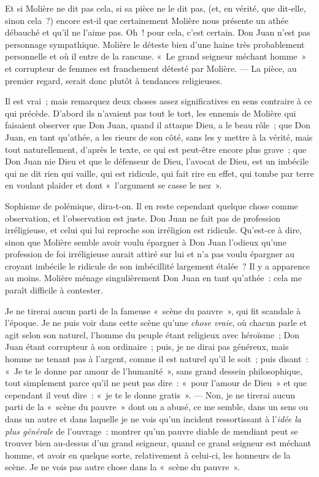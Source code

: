 \documentclass[french,twoside]{book} %
\begin{document}
Et si Molière ne dit pas cela, si sa pièce ne le dit pas, (et, en vérité, que dit-elle, sinon cela ?) encore est-il que certainement Molière nous présente un athée débauché et qu’il ne l’aime pas. Oh ! pour cela, c’est certain. Don Juan n’est pas personnage sympathique. Molière le déteste bien d’une haine  très probablement personnelle et où il entre de la rancune. « Le grand seigneur méchant homme » et corrupteur de femmes est franchement détesté par Molière. — La pièce, au premier regard, serait donc plutôt à tendances religieuses.\par
Il est vrai ; mais remarquez deux choses assez significatives en sens contraire à ce qui précède. D’abord ils n’avaient pas tout le tort, les ennemis de Molière qui faisaient observer que Don Juan, quand il attaque Dieu, a le beau rôle ; que Don Juan, en tant qu’athée, a les rieurs de son côté, sans les y mettre à la vérité, mais tout naturellement, d’après le texte, ce qui est peut-être encore plus grave ; que Don Juan nie Dieu et que le défenseur de Dieu, l’avocat de Dieu, est un imbécile qui ne dit rien qui vaille, qui est ridicule, qui fait rire en effet, qui tombe par terre en voulant plaider et dont « l’argument se casse le nez ».\par
Sophisme de polémique, dira-t-on. Il en reste cependant quelque chose comme observation, et l’observation est juste. Don Juan ne fait pas de profession irréligieuse, et celui qui lui reproche son irréligion est ridicule. Qu’est-ce à dire, sinon que Molière semble avoir voulu épargner à Don Juan l’odieux qu’une profession de foi irréligieuse aurait attiré sur lui et n’a pas voulu épargner  au croyant imbécile le ridicule de son imbécillité largement étalée ? Il y a apparence au moins. Molière ménage singulièrement Don Juan en tant qu’athée : cela me paraît difficile à contester.\par
Je ne tirerai aucun parti de la fameuse « scène du pauvre », qui fit scandale à l’époque. Je ne puis voir dans cette scène qu’une {\itshape chose vraie}, où chacun parle et agit selon son naturel, l’homme du peuple étant religieux avec héroïsme ; Don Juan étant corrupteur à son ordinaire ; puis, je ne dirai pas généreux, mais homme ne tenant pas à l’argent, comme il est naturel qu’il le soit ; puis disant : « Je te le donne par amour de l’humanité », sans grand dessein philosophique, tout simplement parce qu’il ne peut pas dire : « pour l’amour de Dieu » et que cependant il veut dire : « je te le donne gratis ». — Non, je ne tirerai aucun parti de la « scène du pauvre » dont on a abusé, ce me semble, dans un sens ou dans un autre et dans laquelle je ne vois qu’un incident ressortissant à l’{\itshape idée la plus générale} de l’ouvrage : montrer qu’un pauvre diable de mendiant peut se trouver bien au-dessus d’un grand seigneur, quand ce grand seigneur est méchant homme, et avoir en quelque sorte, relativement à celui-ci, les honneurs de la scène. Je ne vois pas autre chose dans la « scène du pauvre ».\par
\end{document}
